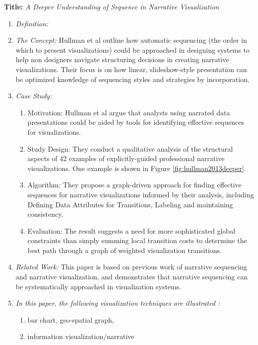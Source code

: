 \documentclass{egpubl}
\begin{document}
\textbf{Title:} \textit{A Deeper Understanding of Sequence in Narrative Visualization}
\begin{enumerate}
\item \textit{Definition:} 
\item \textit{The Concept:} Hullman et al\cite{hullman2013deeper} outline how automatic sequencing (the order in which to present visualizations) could be approached in designing systems to help non designers navigate structuring decisions in creating narrative visualizations. Their focus is on how linear, slideshow-style presentation can be optimized knowledge of sequencing styles and strategies by incorporation.
\item \textit{Case Study:}
\begin{enumerate}
\item Motivation: Hullman et al argue that analysts using narrated data presentations could be aided by tools for identifying effective sequences for visualizations.
\item Study Design: They conduct a qualitative analysis of the structural aspects of 42 examples of explicitly-guided professional narrative visualizations. One example is shown in Figure \ref{fig:hullman2013deeper}.
\item Algorithm: They propose a graph-driven approach for finding effective sequences for narrative visualizations informed by their analysis, including Defining Data Attributes for Transitions, Labeling and maintaining consistency.
\item Evaluation: The result suggests a need for more sophisticated global constraints than simply summing local transition costs to determine the best path through a graph of weighted visualization transitions.
\end{enumerate}
\item \textit{Related Work:} This paper is based on previous work of narrative sequencing\cite{black1979} and narrative visualization\cite{hullman,segal}, and demonstrates that narrative sequencing can be systematically approached in visualization systems.
\item \textit{In this paper, the following visualization techniques are illustrated :} 
\begin{enumerate}
\item bar chart, geo-spatial graph, 
\item information visualization/narrative
\end{enumerate}
\end{enumerate}
\end{document}
